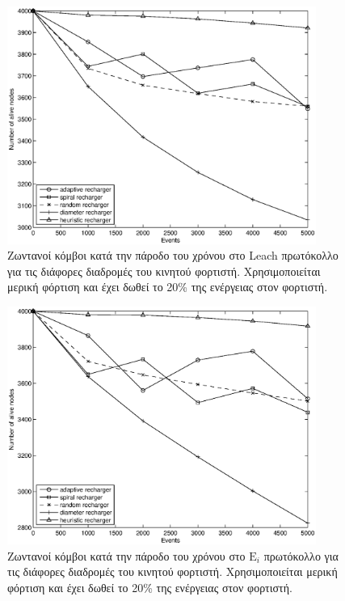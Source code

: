 \begin{figure}[H]
  \centering
  \includegraphics[width=0.9\textwidth]{experiments/4000nodes/4.ourVSnaive/alive_nodes_leach_rc_per_our-spiral-random-diameter-heuristic.eps}
  \caption{Ζωντανοί κόμβοι κατά την πάροδο του χρόνου στο Leach πρωτόκολλο για τις διάφορες διαδρομές του κινητού φορτιστή. Χρησιμοποιείται μερική φόρτιση και έχει
δωθεί το 20\% της ενέργειας στον φορτιστή.}
  \label{fig:5_4exp_1_2}
\end{figure}

\begin{figure}[H]
  \centering
  \includegraphics[width=0.9\textwidth]{experiments/4000nodes/4.ourVSnaive/alive_nodes_ei_rc_per_our-spiral-random-diameter-heuristic.eps}
  \caption{Ζωντανοί κόμβοι κατά την πάροδο του χρόνου στο $\text{E}_{i}$ πρωτόκολλο για τις διάφορες διαδρομές του κινητού φορτιστή. Χρησιμοποιείται μερική φόρτιση
και έχει δωθεί το 20\% της ενέργειας στον φορτιστή.}
  \label{fig:5_4exp_1_3}
\end{figure}




